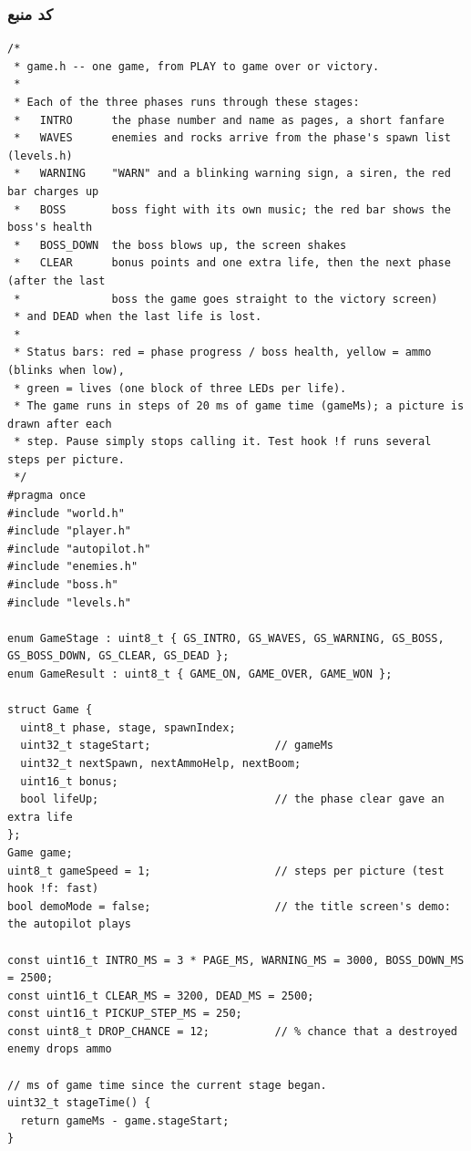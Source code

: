 \documentclass[11pt,a4paper]{article}
\begin{document}
\subsubsection*{کد منبع}
\begin{latin}
\begin{lstlisting}[language=Arduino]
/*
 * game.h -- one game, from PLAY to game over or victory.
 *
 * Each of the three phases runs through these stages:
 *   INTRO      the phase number and name as pages, a short fanfare
 *   WAVES      enemies and rocks arrive from the phase's spawn list (levels.h)
 *   WARNING    "WARN" and a blinking warning sign, a siren, the red bar charges up
 *   BOSS       boss fight with its own music; the red bar shows the boss's health
 *   BOSS_DOWN  the boss blows up, the screen shakes
 *   CLEAR      bonus points and one extra life, then the next phase (after the last
 *              boss the game goes straight to the victory screen)
 * and DEAD when the last life is lost.
 *
 * Status bars: red = phase progress / boss health, yellow = ammo (blinks when low),
 * green = lives (one block of three LEDs per life).
 * The game runs in steps of 20 ms of game time (gameMs); a picture is drawn after each
 * step. Pause simply stops calling it. Test hook !f runs several steps per picture.
 */
#pragma once
#include "world.h"
#include "player.h"
#include "autopilot.h"
#include "enemies.h"
#include "boss.h"
#include "levels.h"

enum GameStage : uint8_t { GS_INTRO, GS_WAVES, GS_WARNING, GS_BOSS, GS_BOSS_DOWN, GS_CLEAR, GS_DEAD };
enum GameResult : uint8_t { GAME_ON, GAME_OVER, GAME_WON };

struct Game {
  uint8_t phase, stage, spawnIndex;
  uint32_t stageStart;                   // gameMs
  uint32_t nextSpawn, nextAmmoHelp, nextBoom;
  uint16_t bonus;
  bool lifeUp;                           // the phase clear gave an extra life
};
Game game;
uint8_t gameSpeed = 1;                   // steps per picture (test hook !f: fast)
bool demoMode = false;                   // the title screen's demo: the autopilot plays

const uint16_t INTRO_MS = 3 * PAGE_MS, WARNING_MS = 3000, BOSS_DOWN_MS = 2500;
const uint16_t CLEAR_MS = 3200, DEAD_MS = 2500;
const uint16_t PICKUP_STEP_MS = 250;
const uint8_t DROP_CHANCE = 12;          // % chance that a destroyed enemy drops ammo

// ms of game time since the current stage began.
uint32_t stageTime() {
  return gameMs - game.stageStart;
}


\end{lstlisting}
\end{latin}
\end{document}
